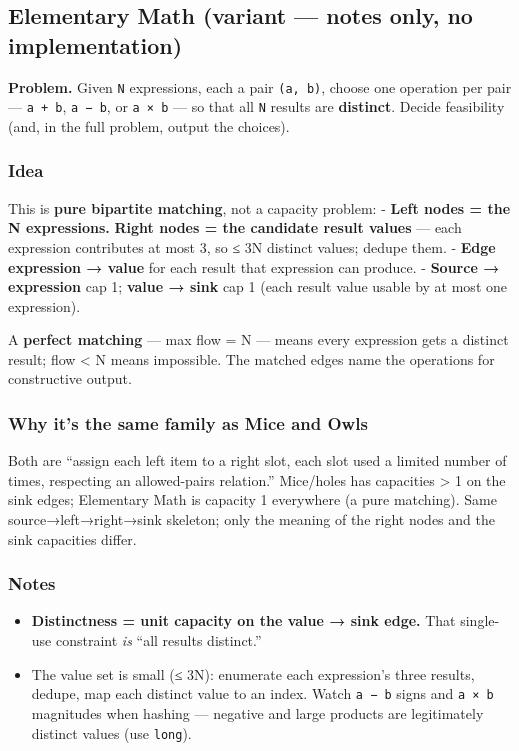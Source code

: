 \documentclass[
  10pt,
  letterpaper,
  onecolumn]{article}
\providecommand{\tightlist}{%
  \setlength{\itemsep}{0pt}\setlength{\parskip}{0pt}}
\begin{document}
\hypertarget{elementary-math-variant-notes-only-no-implementation}{%
\subsection{Elementary Math (variant --- notes only, no
implementation)}\label{elementary-math-variant-notes-only-no-implementation}}

\textbf{Problem.} Given \texttt{N} expressions, each a pair
\texttt{(a,\ b)}, choose one operation per pair --- \texttt{a\ +\ b},
\texttt{a\ −\ b}, or \texttt{a\ ×\ b} --- so that all \texttt{N} results
are \textbf{distinct}. Decide feasibility (and, in the full problem,
output the choices).

\hypertarget{idea-21}{%
\subsubsection{Idea}\label{idea-21}}

This is \textbf{pure bipartite matching}, not a capacity problem: -
\textbf{Left nodes = the N expressions.} \textbf{Right nodes = the
candidate result values} --- each expression contributes at most 3, so ≤
3N distinct values; dedupe them. - \textbf{Edge expression → value} for
each result that expression can produce. - \textbf{Source → expression}
cap 1; \textbf{value → sink} cap 1 (each result value usable by at most
one expression).

A \textbf{perfect matching} --- max flow = N --- means every expression
gets a distinct result; flow \textless{} N means impossible. The matched
edges name the operations for constructive output.

\hypertarget{why-its-the-same-family-as-mice-and-owls}{%
\subsubsection{Why it's the same family as Mice and
Owls}\label{why-its-the-same-family-as-mice-and-owls}}

Both are ``assign each left item to a right slot, each slot used a
limited number of times, respecting an allowed-pairs relation.''
Mice/holes has capacities \textgreater{} 1 on the sink edges; Elementary
Math is capacity 1 everywhere (a pure matching). Same
source→left→right→sink skeleton; only the meaning of the right nodes and
the sink capacities differ.

\hypertarget{notes-19}{%
\subsubsection{Notes}\label{notes-19}}

\begin{itemize}
\tightlist
\item
  \textbf{Distinctness = unit capacity on the value → sink edge.} That
  single-use constraint \emph{is} ``all results distinct.''
\item
  The value set is small (≤ 3N): enumerate each expression's three
  results, dedupe, map each distinct value to an index. Watch
  \texttt{a\ −\ b} signs and \texttt{a\ ×\ b} magnitudes when hashing
  --- negative and large products are legitimately distinct values (use
  \texttt{long}).
\end{itemize}
\end{document}
